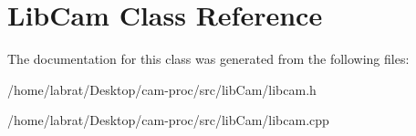 \hypertarget{classLibCam}{}\section{Lib\+Cam Class Reference}
\label{classLibCam}


The documentation for this class was generated from the following files\+:\begin{DoxyCompactItemize}
\item 
/home/labrat/\+Desktop/cam-\/proc/src/lib\+Cam/libcam.\+h\item 
/home/labrat/\+Desktop/cam-\/proc/src/lib\+Cam/libcam.\+cpp\end{DoxyCompactItemize}
